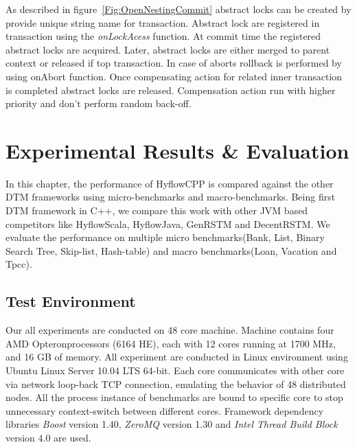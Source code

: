 \documentclass[12pt,english]{report}
\begin{document}
As described in figure~\ref{Fig:OpenNestingCommit} abstract locks can be created by provide unique string name for transaction. Abstract lock are registered in transaction using the \textit{onLockAcess} function. At commit time the registered abstract locks are acquired. Later, abstract locks are either merged to parent context or released if top transaction. In case of aborts rollback is performed by using onAbort function. Once compensating action for related inner transaction is completed abstract locks are released. Compensation action run with higher priority and don't perform random back-off.   

\chapter{Experimental Results \& Evaluation}\label{chap:expResults}

In this chapter, the performance of HyflowCPP is compared against the other DTM frameworks using micro-benchmarks and macro-benchmarks. Being first DTM framework in C++, we compare this work with other JVM based competitors like HyflowScala, HyflowJava, GenRSTM and DecentRSTM. We evaluate the performance on multiple micro benchmarks(Bank, List, Binary Search Tree, Skip-list, Hash-table) and  macro benchmarks(Loan, Vacation and Tpcc).   

\section{Test Environment}

Our all experiments are conducted on 48 core machine. Machine contains four AMD Opteron\texttrademark  processors (6164 HE), each with 12 cores running at 1700 MHz, and 16 GB of memory. All experiment are conducted in Linux environment using Ubuntu Linux Server 10.04 LTS 64-bit.  Each core communicates with other core via network loop-back TCP connection, emulating the behavior of 48 distributed nodes. All the process instance of benchmarks are bound to specific core to stop unnecessary context-switch between different cores. Framework dependency libraries \textit{Boost} version 1.40, \textit{ZeroMQ} version 1.30 and \textit{Intel Thread Build Block} version 4.0 are used.  
\end{document}
